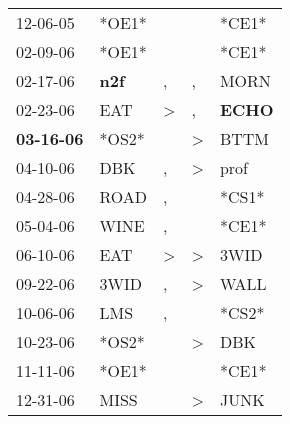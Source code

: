 \begin{supertabular}{p{0.07\textwidth}p{0.06\textwidth}p{0.02\textwidth}p{0.02\textwidth}p{0.06\textwidth}}
          12-06-05\textsuperscript{} &                            *OE1* &                  &                  &                            *CE1* \\
          02-09-06\textsuperscript{} &                            *OE1* &                  &                  &                            *CE1* \\
          02-17-06\textsuperscript{} &   \textbf{n2f\textsuperscript{}} &                , &                , &           MORN\textsuperscript{} \\
          02-23-06\textsuperscript{} &            EAT\textsuperscript{} &     \textgreater &                , &  \textbf{ECHO\textsuperscript{}} \\
 \textbf{03-16-06\textsuperscript{}} &                            *OS2* &                  &     \textgreater &           BTTM\textsuperscript{} \\
          04-10-06\textsuperscript{} &            DBK\textsuperscript{} &                , &     \textgreater &           prof\textsuperscript{} \\
          04-28-06\textsuperscript{} &           ROAD\textsuperscript{} &                , &                  &                            *CS1* \\
          05-04-06\textsuperscript{} &           WINE\textsuperscript{} &                , &                  &                            *CE1* \\
          06-10-06\textsuperscript{} &            EAT\textsuperscript{} &     \textgreater &     \textgreater &           3WID\textsuperscript{} \\
          09-22-06\textsuperscript{} &           3WID\textsuperscript{} &                , &     \textgreater &           WALL\textsuperscript{} \\
          10-06-06\textsuperscript{} &            LMS\textsuperscript{} &                , &                  &                            *CS2* \\
          10-23-06\textsuperscript{} &                            *OS2* &                  &     \textgreater &            DBK\textsuperscript{} \\
          11-11-06\textsuperscript{} &                            *OE1* &                  &                  &                            *CE1* \\
          12-31-06\textsuperscript{} &           MISS\textsuperscript{} &                  &     \textgreater &           JUNK\textsuperscript{} \\

\end{supertabular}
